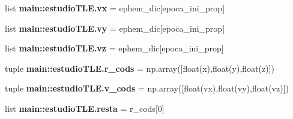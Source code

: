 \begin{DoxyCompactItemize}
list {\bf main\-::estudio\-T\-L\-E.\-vx} = ephem\-\_\-dic[epoca\-\_\-ini\-\_\-prop]
\item 
list {\bf main\-::estudio\-T\-L\-E.\-vy} = ephem\-\_\-dic[epoca\-\_\-ini\-\_\-prop]
\item 
list {\bf main\-::estudio\-T\-L\-E.\-vz} = ephem\-\_\-dic[epoca\-\_\-ini\-\_\-prop]
\item 
tuple {\bf main\-::estudio\-T\-L\-E.\-r\-\_\-cods} = np.\-array([float(x),float(y),float(z)])
\item 
tuple {\bf main\-::estudio\-T\-L\-E.\-v\-\_\-cods} = np.\-array([float(vx),float(vy),float(vz)])
\item 
list {\bf main\-::estudio\-T\-L\-E.\-resta} = r\-\_\-cods[0]
\end{DoxyCompactItemize}
